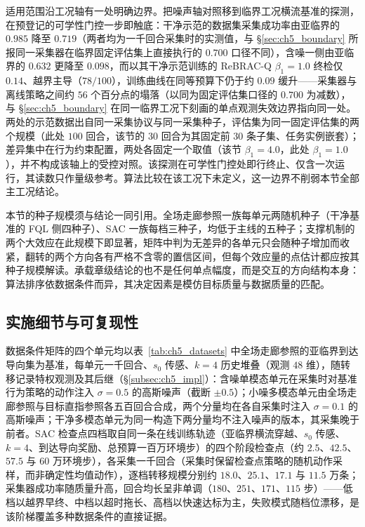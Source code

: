 适用范围沿工况轴有一处明确边界。把噪声轴对照移到临界工况横流基准的探测，在预登记的可学性门控一步即触底：干净示范的数据集采集成功率由亚临界的 $0.985$ 降至 $0.719$（两者均为一千回合采集时的实测值，与 \S\ref{sec:ch5_boundary} 所报同一采集器在临界固定评估集上直接执行的 $0.700$ 口径不同），含噪一侧由亚临界的 $0.632$ 更降至 $0.098$，而以其干净示范训练的 ReBRAC-Q $\beta_1=1.0$ 终检仅 $0.14$、越界主导（$78/100$），训练曲线在同等预算下仍于约 $0.09$ 缓升——采集器与离线策略之间约 $56$ 个百分点的塌落（以同为固定评估集口径的 $0.700$ 为减数），与 \S\ref{sec:ch5_boundary} 在同一临界工况下刻画的单点观测失效边界指向同一处。两处的示范数据出自同一采集协议与同一采集种子，评估集为同一固定评估集的两个规模（此处 $100$ 回合，该节的 $30$ 回合为其固定前 $30$ 条子集、任务实例嵌套）；差异集中在行为约束配置，两处各固定一个取值（该节 $\beta_1=4.0$，此处 $\beta_1=1.0$），并不构成该轴上的受控对照。该探测在可学性门控处即行终止、仅含一次运行，其读数只作量级参考。算法比较在该工况下未定义，这一边界不削弱本节全部主工况结论。

本节的种子规模须与结论一同引用。全场走廊参照一族每单元两随机种子（干净基准的 FQL 侧四种子）、SAC 一族每档三种子，均低于主线的五种子；支撑机制的两个大效应在此规模下即显著，矩阵中判为无差异的各单元只会随种子增加而收紧，翻转的两个方向各有严格不含零的置信区间，但每个效应量的点估计都应按其种子规模解读。承载章级结论的也不是任何单点幅度，而是交互的方向结构本身：算法排序依数据条件而异，其决定因素是模仿目标质量与数据质量的匹配。

\subsection{实施细节与可复现性}\label{subsec:ch5_algo_impl}

数据条件矩阵的四个单元均以表~\ref{tab:ch5_datasets} 中全场走廊参照的亚临界到达导向集为基准，每单元一千回合、$s_0$ 传感、$k=4$ 历史堆叠（观测 $48$ 维），随转移记录特权观测及其后继（\S\ref{subsec:ch5_impl}）：含噪单模态单元在采集时对基准行为策略的动作注入 $\sigma=0.5$ 的高斯噪声（截断 $\pm0.5$）；小噪多模态单元由全场走廊参照与目标直指参照各五百回合合成，两个分量均在各自采集时注入 $\sigma=0.1$ 的高斯噪声；干净多模态单元为同一构造下两分量均不注入噪声的版本，其采集晚于前者。SAC 检查点四档取自同一条在线训练轨迹（亚临界横流穿越、$s_0$ 传感、$k=4$、到达导向奖励、总预算一百万环境步）的四个阶段检查点（约 $2.5$、$42.5$、$57.5$ 与 $60$ 万环境步），各采集一千回合（采集时保留检查点策略的随机动作采样，而非确定性均值动作），逐档转移规模分别约 $18.0$、$25.1$、$17.1$ 与 $11.5$ 万条；采集器成功率随质量升高，回合均长呈非单调（$180$、$251$、$171$、$115$ 步）——低档以越界早终、中档以超时拖长、高档以快速达标为主，失败模式随档位漂移，是该阶梯覆盖多种数据条件的直接证据。

